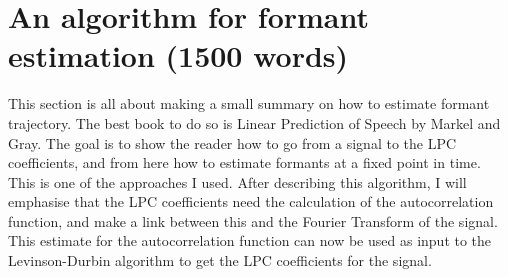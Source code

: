 \documentclass[../main.tex]{subfiles}
\begin{document}
\section*{An algorithm for formant estimation (1500 words)}
    This section is all about making a small summary on how to estimate formant trajectory. The best book to do so is Linear Prediction of Speech by Markel and Gray. The goal is to show the reader how to go from a signal to the LPC coefficients, and from here how to estimate formants at a fixed point in time. This is one of the approaches I used. After describing this algorithm, I will emphasise that the LPC coefficients need the calculation of the autocorrelation function, and make a link between this and the Fourier Transform of the signal. This estimate for the autocorrelation function can now be used as input to the Levinson-Durbin algorithm to get the LPC coefficients for the signal.
    
\end{document}
